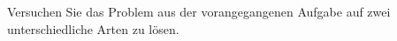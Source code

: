     \item Versuchen Sie das Problem aus der vorangegangenen Aufgabe auf zwei unterschiedliche Arten zu l\"osen.